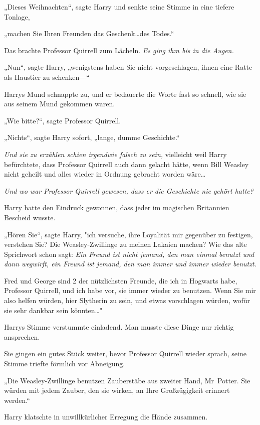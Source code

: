 {„Dieses Weihnachten“, sagte Harry und senkte seine Stimme in eine tiefere Tonlage,

„machen Sie Ihren Freunden das Geschenk…des Todes.“

Das brachte Professor Quirrell zum Lächeln. \emph{Es ging ihm bis in die Augen.}

„Nun“, sagte Harry, „wenigstens haben Sie nicht vorgeschlagen, ihnen eine Ratte als Haustier zu schenken—“

Harrys Mund schnappte zu, und er bedauerte die Worte fast so schnell, wie sie aus seinem Mund gekommen waren.

„Wie bitte?“, sagte Professor Quirrell.

„Nichts“, sagte Harry sofort, „lange, dumme Geschichte.“

\emph{Und sie zu erzählen schien irgendwie falsch zu sein,} vielleicht weil Harry befürchtete, dass Professor Quirrell auch dann gelacht hätte, wenn Bill Weasley nicht geheilt und alles wieder in Ordnung gebracht worden wäre…

\emph{Und wo war Professor Quirrell gewesen, dass er die Geschichte nie gehört hatte?}

Harry hatte den Eindruck gewonnen, dass jeder im magischen Britannien Bescheid wusste.

„Hören Sie“, sagte Harry, "ich versuche, ihre Loyalität mir gegenüber zu festigen, verstehen Sie? Die Weasley-Zwillinge zu meinen Lakaien machen? Wie das alte Sprichwort schon sagt: \emph{Ein Freund ist nicht jemand, den man einmal benutzt und dann wegwirft, ein Freund ist jemand, den man immer und immer wieder benutzt.}

Fred und George sind 2 der nützlichsten Freunde, die ich in Hogwarts habe, Professor Quirrell, und ich habe vor, sie immer wieder zu benutzen. Wenn Sie mir also helfen würden, hier Slytherin zu sein, und etwas vorschlagen würden, wofür sie sehr dankbar sein könnten…"

Harrys Stimme verstummte einladend. Man musste diese Dinge nur richtig ansprechen.

Sie gingen ein gutes Stück weiter, bevor Professor Quirrell wieder sprach, seine Stimme triefte förmlich vor Abneigung.

„Die Weasley-Zwillinge benutzen Zauberstäbe aus zweiter Hand, Mr~Potter. Sie würden mit jedem Zauber, den sie wirken, an Ihre Großzügigkeit erinnert werden.“

Harry klatschte in unwillkürlicher Erregung die Hände zusammen.

}
